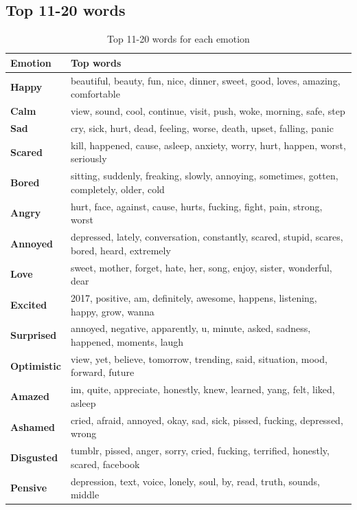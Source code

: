 \documentclass{article} %
\begin{document}
\subsection{Top 11-20 words}
\label{section:appendix-top-words}
\begin{table}[H]
\caption{Top 11-20 words for each emotion}
\begin{center}
    \begin{tabular}{ l | l}
    Emotion & Top words\\
    \hline
    \textbf{Happy} & beautiful, beauty, fun, nice, dinner, sweet, good, loves, amazing, comfortable\\
\textbf{Calm} & view, sound, cool, continue, visit, push, woke, morning, safe, step\\
\textbf{Sad} & cry, sick, hurt, dead, feeling, worse, death, upset, falling, panic\\
\textbf{Scared} & kill, happened, cause, asleep, anxiety, worry, hurt, happen, worst, seriously\\
\textbf{Bored} & sitting, suddenly, freaking, slowly, annoying, sometimes, gotten, completely, older, cold\\
\textbf{Angry} & hurt, face, against, cause, hurts, fucking, fight, pain, strong, worst\\
\textbf{Annoyed} & depressed, lately, conversation, constantly, scared, stupid, scares, bored, heard, extremely\\
\textbf{Love} &  sweet, mother, forget, hate, her, song, enjoy, sister, wonderful, dear\\
\textbf{Excited} & 2017, positive, am, definitely, awesome, happens, listening, happy, grow, wanna\\
\textbf{Surprised} & annoyed, negative, apparently, u, minute, asked, sadness, happened, moments, laugh\\
\textbf{Optimistic} & view, yet, believe, tomorrow, trending, said, situation, mood, forward, future\\
\textbf{Amazed} & im, quite, appreciate, honestly, knew, learned, yang, felt, liked, asleep\\
\textbf{Ashamed} & cried, afraid, annoyed, okay, sad, sick, pissed, fucking, depressed, wrong\\
\textbf{Disgusted} & tumblr, pissed, anger, sorry, cried, fucking, terrified, honestly, scared, facebook\\
\textbf{Pensive} &  depression, text, voice, lonely, soul, by, read, truth, sounds, middle\\
    \end{tabular}
\end{center} 
\end{table}
\end{document}
